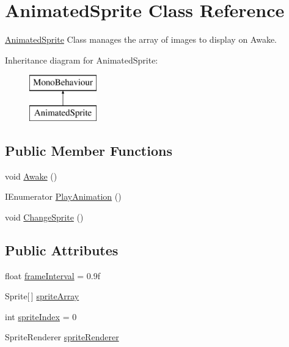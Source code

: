 \hypertarget{class_animated_sprite}{\section{Animated\-Sprite Class Reference}
\label{class_animated_sprite}
}


\hyperlink{class_animated_sprite}{Animated\-Sprite} Class manages the array of images to display on Awake.  


Inheritance diagram for Animated\-Sprite\-:\begin{figure}[H]
\begin{center}
\leavevmode
\includegraphics[height=2.000000cm]{class_animated_sprite}
\end{center}
\end{figure}
\subsection*{Public Member Functions}
\begin{DoxyCompactItemize}
\item 
void \hyperlink{class_animated_sprite_ae729d36bce4043bb5ce3da541d0e2ba1}{Awake} ()
\item 
I\-Enumerator \hyperlink{class_animated_sprite_af5f0b329b424f4ea6a646bb9cc4e97d6}{Play\-Animation} ()
\item 
void \hyperlink{class_animated_sprite_a2623e6f78c11daf4573cfabea0d9dff0}{Change\-Sprite} ()
\end{DoxyCompactItemize}
\subsection*{Public Attributes}
\begin{DoxyCompactItemize}
\item 
float \hyperlink{class_animated_sprite_a70ddec1e72a29a25c16175c7dc53decf}{frame\-Interval} = 0.\-9f
\item 
Sprite\mbox{[}$\,$\mbox{]} \hyperlink{class_animated_sprite_a8c8ae3e620f9b0029dca501c5d6dd1a1}{sprite\-Array}
\item 
int \hyperlink{class_animated_sprite_ad2906feaf88a9334c785e7f2bb32f2ad}{sprite\-Index} = 0
\item 
Sprite\-Renderer \hyperlink{class_animated_sprite_a7f733f377e105ea251accd4d6018b5f7}{sprite\-Renderer}
\end{DoxyCompactItemize}


